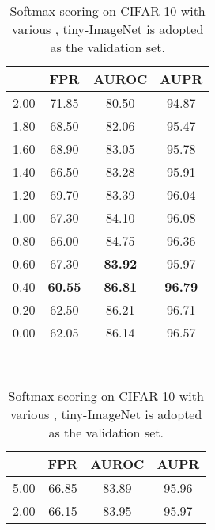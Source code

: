 \documentclass{article}
\begin{document}
\begin{table}[t]
\centering
\parbox{.30\linewidth}{
\centering
\scriptsize
\caption{Softmax scoring on CIFAR- with various , tiny-ImageNet is adopted as the validation set.} \label{tab: 38}
\vspace{5pt}
{
\begin{tabular}{c|ccc}
\toprule[1.5pt]
             & FPR     & AUROC       & AUPR      \\
\midrule[0.6pt]
2.00               & 71.85                  & 80.50                  & 94.87      \\
1.80               & 68.50                  & 82.06                  & 95.47      \\
1.60               & 68.90                  & 83.05                  & 95.78       \\
1.40               & 66.50                  & 83.28                  & 95.91      \\
1.20               & 69.70                  & 83.39                  & 96.04      \\
1.00               & 67.30                  & 84.10                  & 96.08 \\ 
0.80               & 66.00                  & 84.75                  & 96.36 \\
0.60               & {67.30}                  & \textbf{83.92}                  & 95.97 \\ 
\cellcolor{greyC}0.40               & \cellcolor{greyC}\textbf{60.55}                  & \cellcolor{greyC}\textbf{86.81}                  & \cellcolor{greyC}\textbf{96.79}  \\
0.20               & 62.50                  & 86.21                  & 96.71  \\
0.00               & 62.05                  & 86.14                  & 96.57  \\ 
\bottomrule[1.5pt]      
\end{tabular}
}}~~
\parbox{.30\linewidth}{
\centering
\caption{Softmax scoring on CIFAR-10 with various , tiny-ImageNet is adopted as the validation set.} 
\scriptsize
\vspace{5pt}
{
\begin{tabular}{c|ccc}
\toprule[1.5pt]
            & FPR     & AUROC      & AUPR      \\
\midrule[0.6pt]
5.00               & 66.85                  & 83.89                  & 95.96       \\
2.00               & 66.15                  & 83.95                  & 95.97       \\

\end{tabular}}}
\end{table}
\end{document}
